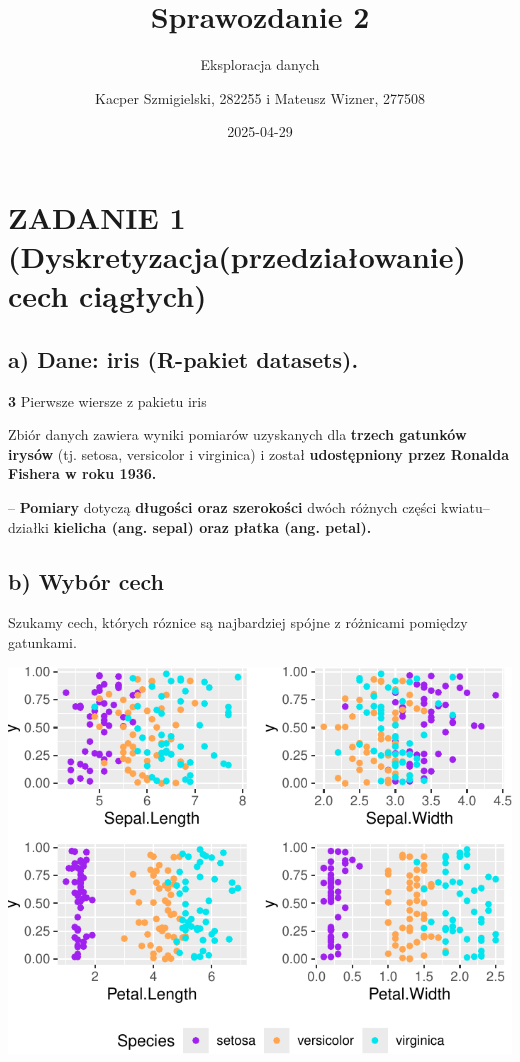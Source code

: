 \documentclass[
  12pt,
]{article}
\title{Sprawozdanie 2}
\subtitle{Eksploracja danych}
\author{Kacper Szmigielski, 282255 i Mateusz Wizner, 277508}
\date{2025-04-29}
\begin{document}
\maketitle

{
\setcounter{tocdepth}{3}
\tableofcontents
}
\section{ZADANIE 1 (Dyskretyzacja(przedziałowanie) cech
ciągłych)}\label{zadanie-1-dyskretyzacjaprzedziaux142owanie-cech-ciux105gux142ych}

\subsection{a) Dane: iris (R-pakiet
datasets).}\label{a-dane-iris-r-pakiet-datasets.}

\textbf{3} Pierwsze wiersze z pakietu iris

Zbiór danych zawiera wyniki pomiarów uzyskanych dla \textbf{trzech
gatunków irysów} (tj. setosa, versicolor i virginica) i został
\textbf{udostępniony przez Ronalda Fishera w roku 1936.}

-- \textbf{Pomiary} dotyczą \textbf{długości oraz szerokości} dwóch
różnych części kwiatu-- działki \textbf{kielicha (ang. sepal) oraz
płatka (ang. petal).}

\subsection{b) Wybór cech}\label{b-wybuxf3r-cech}

Szukamy cech, których róznice są najbardziej spójne z różnicami pomiędzy
gatunkami.

\begin{center}\includegraphics{Sprawozdanie2_files/figure-latex/zad1b1-1} \end{center}
\end{document}
